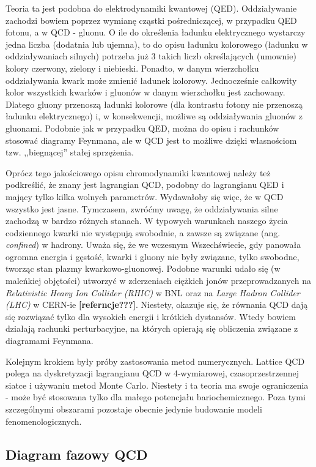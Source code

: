 \documentclass[a4paper,12pt]{article}
\begin{document}
Teoria ta jest podobna do elektrodynamiki kwantowej (QED). Oddziaływanie zachodzi bowiem poprzez wymianę cząstki pośredniczącej, w przypadku QED fotonu, a w QCD - gluonu. O ile do określenia ładunku elektrycznego wystarczy jedna liczba (dodatnia lub ujemna), to do opisu ładunku kolorowego (ładunku w oddziaływaniach silnych) potrzeba już 3 takich liczb określających (umownie) kolory czerwony, zielony i niebieski. Ponadto, w danym wierzchołku oddziaływania kwark może zmienić ładunek kolorowy. Jednocześnie całkowity kolor wszystkich kwarków i gluonów w danym wierzchołku jest zachowany. Dlatego gluony przenoszą ładunki kolorowe (dla kontrastu fotony nie przenoszą ładunku elektrycznego) i, w konsekwencji, możliwe są oddziaływania gluonów z gluonami. Podobnie jak w przypadku QED, można do opisu i rachunków stosować diagramy Feynmana, ale w QCD jest to możliwe dzięki własnościom tzw. ,,biegnącej'' stałej sprzężenia\cite{griffiths}.

Oprócz tego jakościowego opisu chromodynamiki kwantowej należy też podkreślić, że znany jest lagrangian QCD, podobny do lagrangianu QED i mający tylko kilka wolnych parametrów. Wydawałoby się więc, że w QCD wszystko jest jasne. Tymczasem, zwróćmy uwagę, że oddziaływania silne zachodzą w bardzo różnych stanach. W typowych warunkach naszego życia codziennego kwarki nie występują swobodnie, a zawsze są związane (ang. \textit{confined}) w hadrony. Uważa się, że we wczesnym Wszechświecie, gdy panowała ogromna energia i gęstość, kwarki i gluony nie były związane, tylko swobodne, tworząc stan plazmy kwarkowo-gluonowej. Podobne warunki udało się (w maleńkiej objętości) utworzyć w zderzeniach ciężkich jonów przeprowadzanych na \textit{Relativistic Heavy Ion Collider (RHIC)} w BNL oraz na \textit{Large Hadron Collider (LHC)} w CERN-ie \textbf{\color{blue} [referncje???]}. Niestety, okazuje się, że równania QCD dają się rozwiązać tylko dla wysokich energii i krótkich dystansów. Wtedy bowiem działają rachunki perturbacyjne, na których opierają się obliczenia związane z diagramami Feynmana.

Kolejnym krokiem były próby zastosowania metod numerycznych. Lattice QCD polega na dyskretyzacji lagrangianu QCD w 4-wymiarowej, czasoprzestrzennej siatce i używaniu metod Monte Carlo. Niestety i ta teoria ma swoje ograniczenia - może być stosowana tylko dla małego potencjału bariochemicznego. Poza tymi szczególnymi obszarami pozostaje obecnie jedynie budowanie modeli fenomenologicznych.

\subsection{Diagram fazowy QCD}
\end{document}
